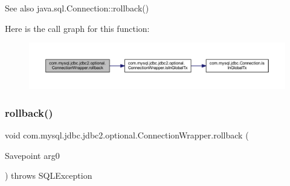 \begin{DoxySeeAlso}{See also}
java.\+sql.\+Connection\+::rollback() 
\end{DoxySeeAlso}
Here is the call graph for this function\+:
\nopagebreak
\begin{figure}[H]
\begin{center}
\leavevmode
\includegraphics[width=350pt]{classcom_1_1mysql_1_1jdbc_1_1jdbc2_1_1optional_1_1_connection_wrapper_a970363042f006042fefc3c7a3f2d93f1_cgraph}
\end{center}
\end{figure}
\mbox{\label{classcom_1_1mysql_1_1jdbc_1_1jdbc2_1_1optional_1_1_connection_wrapper_aff1095ad260e93297f4318969655324f}} 
\subsubsection{\texorpdfstring{rollback()}{rollback()}\hspace{0.1cm}{\footnotesize\ttfamily [2/2]}}
{\footnotesize\ttfamily void com.\+mysql.\+jdbc.\+jdbc2.\+optional.\+Connection\+Wrapper.\+rollback (\begin{DoxyParamCaption}\item[{Savepoint}]{arg0 }\end{DoxyParamCaption}) throws S\+Q\+L\+Exception}

